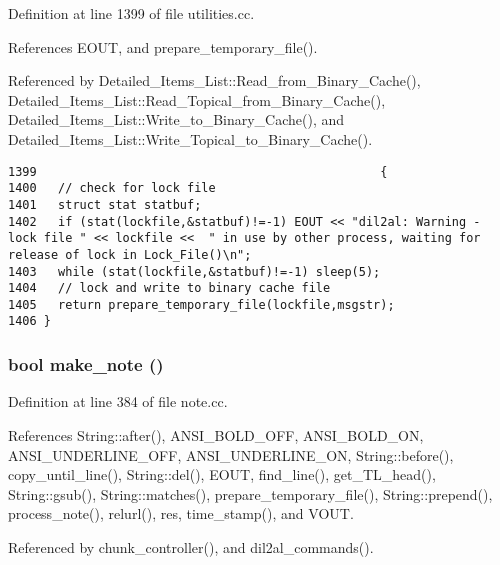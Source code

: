Definition at line 1399 of file utilities.cc.

References EOUT, and prepare\_\-temporary\_\-file().

Referenced by Detailed\_\-Items\_\-List::Read\_\-from\_\-Binary\_\-Cache(), Detailed\_\-Items\_\-List::Read\_\-Topical\_\-from\_\-Binary\_\-Cache(), Detailed\_\-Items\_\-List::Write\_\-to\_\-Binary\_\-Cache(), and Detailed\_\-Items\_\-List::Write\_\-Topical\_\-to\_\-Binary\_\-Cache().



\footnotesize\begin{verbatim}1399                                                {
1400   // check for lock file
1401   struct stat statbuf;
1402   if (stat(lockfile,&statbuf)!=-1) EOUT << "dil2al: Warning - lock file " << lockfile <<  " in use by other process, waiting for release of lock in Lock_File()\n";
1403   while (stat(lockfile,&statbuf)!=-1) sleep(5);
1404   // lock and write to binary cache file
1405   return prepare_temporary_file(lockfile,msgstr);
1406 }
\end{verbatim}\normalsize 
{}
\subsubsection{\setlength{\rightskip}{0pt plus 5cm}bool make\_\-note ()}\label{dil2al_8hh_a338}




Definition at line 384 of file note.cc.

References String::after(), ANSI\_\-BOLD\_\-OFF, ANSI\_\-BOLD\_\-ON, ANSI\_\-UNDERLINE\_\-OFF, ANSI\_\-UNDERLINE\_\-ON, String::before(), copy\_\-until\_\-line(), String::del(), EOUT, find\_\-line(), get\_\-TL\_\-head(), String::gsub(), String::matches(), prepare\_\-temporary\_\-file(), String::prepend(), process\_\-note(), relurl(), res, time\_\-stamp(), and VOUT.

Referenced by chunk\_\-controller(), and dil2al\_\-commands().



